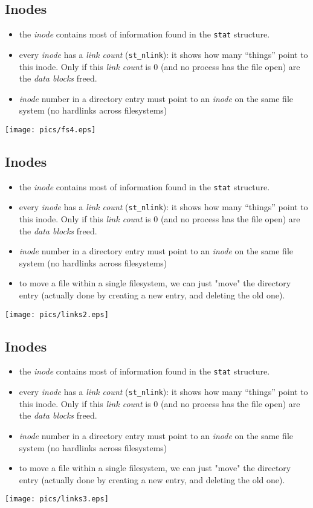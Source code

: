 \documentclass[xga]{xdvislides}
\begin{document}
\subsection{Inodes}
\begin{itemize}
	\item the {\em inode} contains most of information found in the {\tt stat}
		structure.
	\item every {\em inode} has a {\em link count} ({\tt st\_nlink}):  it
		shows how many ``things'' point to this inode.  Only if this
		{\em link count} is 0 (and no process has the file open) are the
		{\em data blocks} freed.
	\item {\em inode} number in a directory entry must point to an {\em inode}
		on the same file system (no hardlinks across filesystems)
\end{itemize}
\texttt{[image: pics/fs4.eps]}


\subsection{Inodes}
\begin{itemize}
	\item the {\em inode} contains most of information found in the {\tt stat}
		structure.
	\item every {\em inode} has a {\em link count} ({\tt st\_nlink}):  it
		shows how many ``things'' point to this inode.  Only if this
		{\em link count} is 0 (and no process has the file open) are the
		{\em data blocks} freed.
	\item {\em inode} number in a directory entry must point to an {\em inode}
		on the same file system (no hardlinks across filesystems)
	\item to move a file within a single filesystem, we can just "move" the
		directory entry (actually done by creating a new entry, and deleting
		the old one).
\end{itemize}
\texttt{[image: pics/links2.eps]}

\subsection{Inodes}
\begin{itemize}
	\item the {\em inode} contains most of information found in the {\tt stat}
		structure.
	\item every {\em inode} has a {\em link count} ({\tt st\_nlink}):  it
		shows how many ``things'' point to this inode.  Only if this
		{\em link count} is 0 (and no process has the file open) are the
		{\em data blocks} freed.
	\item {\em inode} number in a directory entry must point to an {\em inode}
		on the same file system (no hardlinks across filesystems)
	\item to move a file within a single filesystem, we can just "move" the
		directory entry (actually done by creating a new entry, and deleting
		the old one).
\end{itemize}
\texttt{[image: pics/links3.eps]}
\end{document}
